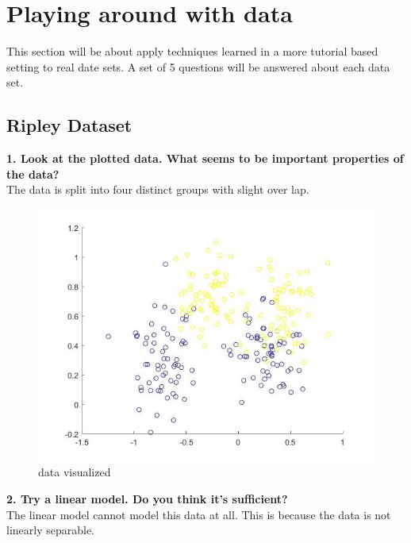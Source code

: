 \documentclass[11pt,oneside,a4paper]{article}
\begin{document}
\section{Playing around with data}

This section will be about apply techniques learned in a more tutorial based setting to real date sets. A set of 5 questions will be answered about each data set.

\subsection{Ripley Dataset}


\textbf{1. Look at the plotted data. What seems to be important properties of the data?}\\

The data is split into four distinct groups with slight over lap. 
\begin{figure}[H]
	\centering
	\includegraphics[scale=0.4]{../Figures/ripley_vis}
	\caption{data visualized}
\end{figure}

\textbf{2. Try a linear model. Do you think it’s sufficient?}\\
The linear model cannot model this data at all. This is because the data is not linearly separable. 
\end{document}
